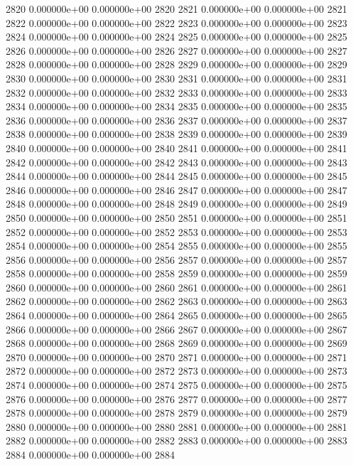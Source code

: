 \documentclass{article}
\begin{document}
\begin{Schunk}
\begin{Soutput}
2820   0.000000e+00   0.000000e+00 2820
2821   0.000000e+00   0.000000e+00 2821
2822   0.000000e+00   0.000000e+00 2822
2823   0.000000e+00   0.000000e+00 2823
2824   0.000000e+00   0.000000e+00 2824
2825   0.000000e+00   0.000000e+00 2825
2826   0.000000e+00   0.000000e+00 2826
2827   0.000000e+00   0.000000e+00 2827
2828   0.000000e+00   0.000000e+00 2828
2829   0.000000e+00   0.000000e+00 2829
2830   0.000000e+00   0.000000e+00 2830
2831   0.000000e+00   0.000000e+00 2831
2832   0.000000e+00   0.000000e+00 2832
2833   0.000000e+00   0.000000e+00 2833
2834   0.000000e+00   0.000000e+00 2834
2835   0.000000e+00   0.000000e+00 2835
2836   0.000000e+00   0.000000e+00 2836
2837   0.000000e+00   0.000000e+00 2837
2838   0.000000e+00   0.000000e+00 2838
2839   0.000000e+00   0.000000e+00 2839
2840   0.000000e+00   0.000000e+00 2840
2841   0.000000e+00   0.000000e+00 2841
2842   0.000000e+00   0.000000e+00 2842
2843   0.000000e+00   0.000000e+00 2843
2844   0.000000e+00   0.000000e+00 2844
2845   0.000000e+00   0.000000e+00 2845
2846   0.000000e+00   0.000000e+00 2846
2847   0.000000e+00   0.000000e+00 2847
2848   0.000000e+00   0.000000e+00 2848
2849   0.000000e+00   0.000000e+00 2849
2850   0.000000e+00   0.000000e+00 2850
2851   0.000000e+00   0.000000e+00 2851
2852   0.000000e+00   0.000000e+00 2852
2853   0.000000e+00   0.000000e+00 2853
2854   0.000000e+00   0.000000e+00 2854
2855   0.000000e+00   0.000000e+00 2855
2856   0.000000e+00   0.000000e+00 2856
2857   0.000000e+00   0.000000e+00 2857
2858   0.000000e+00   0.000000e+00 2858
2859   0.000000e+00   0.000000e+00 2859
2860   0.000000e+00   0.000000e+00 2860
2861   0.000000e+00   0.000000e+00 2861
2862   0.000000e+00   0.000000e+00 2862
2863   0.000000e+00   0.000000e+00 2863
2864   0.000000e+00   0.000000e+00 2864
2865   0.000000e+00   0.000000e+00 2865
2866   0.000000e+00   0.000000e+00 2866
2867   0.000000e+00   0.000000e+00 2867
2868   0.000000e+00   0.000000e+00 2868
2869   0.000000e+00   0.000000e+00 2869
2870   0.000000e+00   0.000000e+00 2870
2871   0.000000e+00   0.000000e+00 2871
2872   0.000000e+00   0.000000e+00 2872
2873   0.000000e+00   0.000000e+00 2873
2874   0.000000e+00   0.000000e+00 2874
2875   0.000000e+00   0.000000e+00 2875
2876   0.000000e+00   0.000000e+00 2876
2877   0.000000e+00   0.000000e+00 2877
2878   0.000000e+00   0.000000e+00 2878
2879   0.000000e+00   0.000000e+00 2879
2880   0.000000e+00   0.000000e+00 2880
2881   0.000000e+00   0.000000e+00 2881
2882   0.000000e+00   0.000000e+00 2882
2883   0.000000e+00   0.000000e+00 2883
2884   0.000000e+00   0.000000e+00 2884

\end{Soutput}
\end{Schunk}
\end{document}
